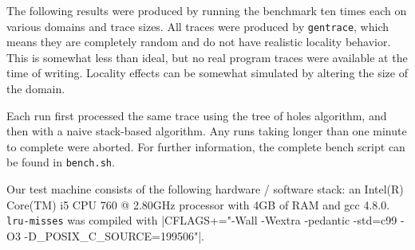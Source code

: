\documentclass[a4paper,10pt]{article}
\begin{document}
The following results were produced by running the benchmark ten times each
on various domains and trace sizes. All traces were produced by \verb|gentrace|, which means
they are completely random and do not have realistic locality behavior. This is somewhat
less than ideal, but no real program traces were available at the time of writing.
Locality effects can be somewhat simulated by altering the size of the domain.

Each run first processed the same trace using the tree of holes algorithm, and then
with a naive stack-based algorithm.
Any runs taking longer than one minute to complete
were aborted. For further information, the complete bench script can be found in
\verb|bench.sh|.

Our test machine consists of the following hardware / software stack: an Intel(R) Core(TM) i5 CPU 760 @ 2.80GHz
processor with 4GB of RAM and gcc 4.8.0. \verb|lru-misses| was compiled with \spverb|CFLAGS+="-Wall -Wextra -pedantic -std=c99 -O3 -D_POSIX_C_SOURCE=199506"|.

\vspace{3mm}
\end{document}
